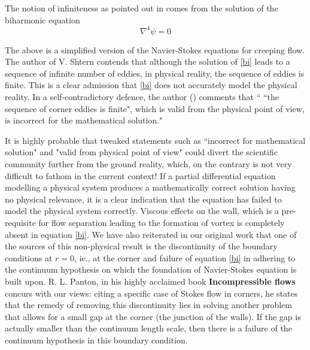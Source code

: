
      

\date{Received: date / Accepted: date}


\maketitle

The notion of infiniteness as pointed out in \cite{kal18,sh18} comes from the solution of the biharmonic equation
\begin{equation}\label{bi}
\nabla^4\psi=0
\end{equation}

The above is a simplified version of the Navier-Stokes equations for creeping flow. The author of \cite{sh18} V. Shtern contends that although the solution of \eqref{bi} leads to a sequence of infinite number of eddies, in physical reality, the sequence of eddies is finite. This is a clear admission that \eqref{bi} does not accurately model the physical reality. In a self-contradictory defence, the author (\cite{sh18}) comments that `` ``the sequence of corner eddies is finite", which is valid from the physical point of view, is incorrect for the mathematical solution." 

It is highly probable that tweaked statements such as ``incorrect for mathematical solution" and "valid from physical point of view" could divert the scientific community further from the ground reality, which, on the contrary is not very difficult to fathom in the current context! If a partial differential equation modelling a physical system produces a mathematically correct solution having no physical relevance, it is a clear indication that the equation has failed to  model the physical system correctly. Viscous effects on the wall, which is a pre-requisite for flow separation leading to the formation of vortex is completely absent in equation \eqref{bi}.  We have also reiterated in our original work \cite{kal18} that one of the sources of this non-physical result is the discontinuity of the boundary conditions at $r=0$, ie., at the corner and  failure of equation \eqref{bi} in adhering to the continuum hypothesis on which the foundation of Navier-Stokes equation is built upon. R. L. Panton, in his highly acclaimed book {\bf Incompressible flows} \cite{pan} concurs with our views: citing a specific case of Stokes flow in corners, he states that the remedy of removing this discontinuity lies in solving another problem that allows for a small gap at the corner (the junction of the walls). If the gap is actually smaller than the continuum length scale, then there is a failure of the continuum hypothesis in this boundary condition.  

